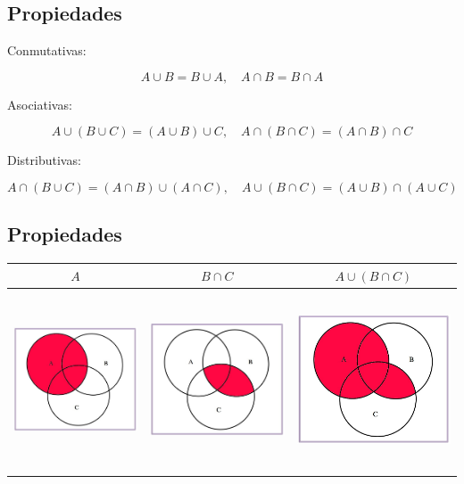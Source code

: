 \documentclass[]{book}
\begin{document}
\hypertarget{propiedades}{%
\subsection{Propiedades}\label{propiedades}}

Conmutativas:

\[A\cup B=B\cup A, \quad A\cap B=B\cap A\]

Asociativas:

\[A\cup(B\cup C)=(A\cup B)\cup C, \quad A\cap(B\cap C)=(A\cap B)\cap C\]

Distributivas:

\[A\cap(B\cup C)=(A\cap B)\cup (A\cap C), \quad A\cup(B\cap C)=(A\cup B)\cap (A\cup C)\]

\hypertarget{propiedades-1}{%
\subsection{Propiedades}\label{propiedades-1}}

\begin{longtable}[]{@{}ccc@{}}
\toprule
\(A\) & \(B\cap C\) & \(A\cup (B\cap C)\)\tabularnewline
\midrule
\endhead
\includegraphics[width=\textwidth,height=2.08333in]{Images/proba1dibujos/distr11.jpg} & \includegraphics[width=\textwidth,height=2.08333in]{Images/proba1dibujos/distr12.jpg} & \includegraphics[width=\textwidth,height=2.08333in]{Images/proba1dibujos/distr13.jpg}\tabularnewline
\bottomrule
\end{longtable}
\end{document}
